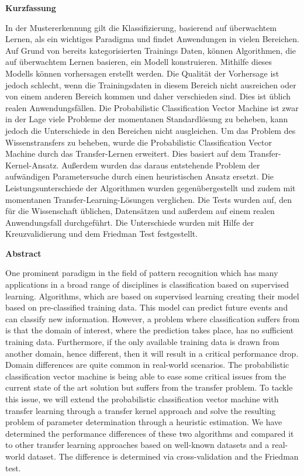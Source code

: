 \begin{center}
 	\Large\textbf{Kurzfassung}\\
\end{center}
In der Mustererkennung gilt die Klassifizierung, basierend auf überwachtem Lernen, als ein wichtiges Paradigma und findet Anwendungen in vielen Bereichen. Auf Grund von bereits kategorisierten Trainings Daten, können Algorithmen, die auf überwachtem Lernen basieren, ein Modell konstruieren. Mithilfe dieses Modells können vorhersagen erstellt werden. Die Qualität der Vorhersage ist jedoch schlecht, wenn die Trainingsdaten in diesem Bereich nicht ausreichen oder von einem anderen Bereich kommen und daher verschieden sind. Dies ist üblich realen Anwendungsfällen. Die Probabilistic Classification Vector Machine ist zwar in der Lage viele Probleme der momentanen Standardlösung zu beheben, kann jedoch die Unterschiede in den Bereichen nicht ausgleichen. Um das Problem des Wissenstransfers zu beheben, wurde die Probabilistic Classification Vector Machine durch das Transfer-Lernen erweitert. Dies basiert auf dem Transfer-Kernel-Ansatz. Außerdem wurden das daraus entstehende Problem der aufwändigen Parametersuche durch einen heuristischen Ansatz ersetzt. Die Leistungsunterschiede der Algorithmen wurden gegenübergestellt und zudem mit momentanen Transfer-Learning-Lösungen verglichen. Die Tests wurden auf, den für die Wissenschaft üblichen, Datensätzen und außerdem auf einem realen Anwendungsfall durchgeführt. Die Unterschiede wurden mit Hilfe der Kreuzvalidierung und dem Friedman Test festgestellt.
\newpage

\begin{center}
	\Large\textbf{Abstract}\\
\end{center}
One prominent paradigm in the field of pattern recognition which has many applications in a broad range of disciplines is classification based on supervised learning. 
Algorithms, which are based on supervised learning creating their model based on pre-classified training data.
This model can predict future events and can classify new information.
However, a problem where classification suffers from is that the domain of interest, where the prediction takes place, has no sufficient training data. 
Furthermore, if the only available training data is drawn from another domain, hence different, then it will result in a critical performance drop.
Domain differences are quite common in real-world scenarios.
The probabilistic classification vector machine is being able to ease some critical issues from the current state of the art solution but suffers from the transfer problem.
To tackle this issue, we will extend the probabilistic classification vector machine with transfer learning through a transfer kernel approach and solve the resulting problem of parameter determination through a heuristic estimation. 
We have determined the performance differences of these two algorithms and compared it to other transfer learning approaches based on well-known datasets and a real-world dataset. 
The difference is determined via cross-validation and the Friedman test.
